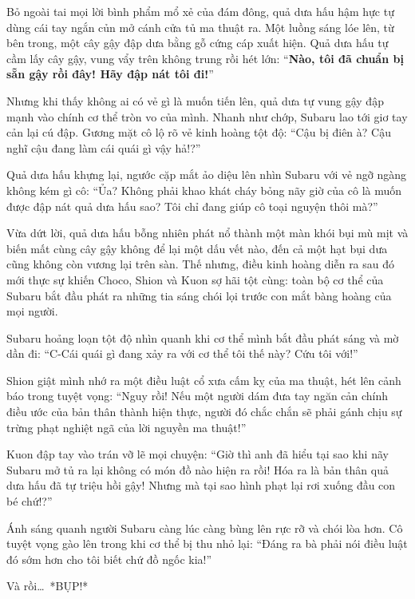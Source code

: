 \documentclass[../main.tex]{subfiles}
\begin{document}
Bỏ ngoài tai mọi lời bình phẩm mổ xẻ của đám đông, quả dưa hấu hậm hực tự dùng cái tay ngắn củn mở cánh cửa tủ ma thuật ra. Một luồng sáng lóe lên, từ bên trong, một cây gậy đập dưa bằng gỗ cứng cáp xuất hiện. Quả dưa hấu tự cầm lấy cây gậy, vung vẩy trên không trung rồi hét lớn:
``\textbf{Nào, tôi đã chuẩn bị sẵn gậy rồi đây! Hãy đập nát tôi đi!}''


Nhưng khi thấy không ai có vẻ gì là muốn tiến lên, quả dưa tự vung gậy đập mạnh vào chính cơ thể tròn vo của mình. Nhanh như chớp, Subaru lao tới giơ tay cản lại cú đập. Gương mặt cô lộ rõ vẻ kinh hoàng tột độ:
``Cậu bị điên à? Cậu nghĩ cậu đang làm cái quái gì vậy hả!?''

Quả dưa hấu khựng lại, ngước cặp mắt ảo diệu lên nhìn Subaru với vẻ ngỡ ngàng không kém gì cô:
``Ủa? Không phải khao khát cháy bỏng nãy giờ của cô là muốn được đập nát quả dưa hấu sao? Tôi chỉ đang giúp cô toại nguyện thôi mà?''

Vừa dứt lời, quả dưa hấu bỗng nhiên phát nổ thành một màn khói bụi mù mịt và biến mất cùng cây gậy không để lại một dấu vết nào, đến cả một hạt bụi dưa cũng không còn vương lại trên sàn. Thế nhưng, điều kinh hoàng diễn ra sau đó mới thực sự khiến Choco, Shion và Kuon sợ hãi tột cùng: toàn bộ cơ thể của Subaru bắt đầu phát ra những tia sáng chói lọi trước con mắt bàng hoàng của mọi người.


Subaru hoảng loạn tột độ nhìn quanh khi cơ thể mình bắt đầu phát sáng và mờ dần đi:
``C-Cái quái gì đang xảy ra với cơ thể tôi thế này? Cứu tôi với!''

Shion giật mình nhớ ra một điều luật cổ xưa cấm kỵ của ma thuật, hét lên cảnh báo trong tuyệt vọng:
``Nguy rồi! Nếu một người dám đưa tay ngăn cản chính điều ước của bản thân thành hiện thực, người đó chắc chắn sẽ phải gánh chịu sự trừng phạt nghiệt ngã của lời nguyền ma thuật!''

Kuon đập tay vào trán vỡ lẽ mọi chuyện:
``Giờ thì anh đã hiểu tại sao khi nãy Subaru mở tủ ra lại không có món đồ nào hiện ra rồi! Hóa ra là bản thân quả dưa hấu đã tự triệu hồi gậy! Nhưng mà tại sao hình phạt lại rơi xuống đầu con bé chứ!?''

Ánh sáng quanh người Subaru càng lúc càng bùng lên rực rỡ và chói lòa hơn. Cô tuyệt vọng gào lên trong khi cơ thể bị thu nhỏ lại:
``Đáng ra bà phải nói điều luật đó sớm hơn cho tôi biết chứ đồ ngốc kia!''

Và rồi\dots\ *BỤP!*
\end{document}
